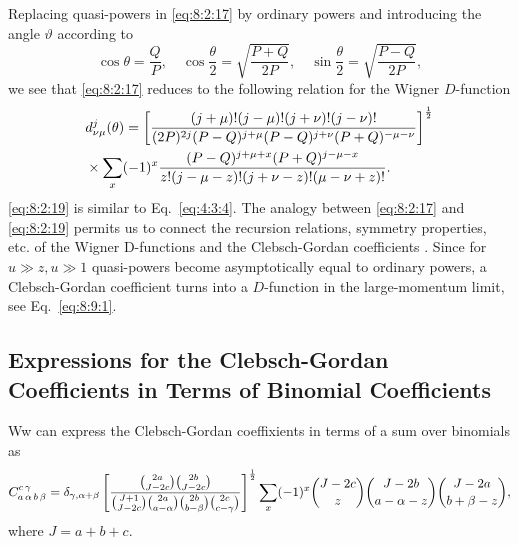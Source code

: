 Replacing quasi-powers in \eqref{eq:8:2:17} by ordinary powers and introducing the angle $\vartheta$ according to
\begin{equation}
\cos \theta=\frac{Q}{P}, \quad \cos \frac{\theta}{2}=\sqrt{\frac{P+Q}{2 P}}, \quad \sin \frac{\theta}{2}=\sqrt{\frac{P-Q}{2 P}}, \label{eq:8:2:18}
\end{equation}
we see that \eqref{eq:8:2:17} reduces to the following relation for the Wigner $D$-function
\begin{align}
& d_{\nu \mu}^{j}(\theta)=\left[\frac{(j+\mu)!(j-\mu)!(j+\nu)!(j-\nu)!}{(2 P)^{2 j}(P-Q)^{j+\mu}(P-Q)^{j+\nu}(P+Q)^{-\mu-\nu}}\right]^{\frac{1}{2}}  \notag\\
& \times \sum_{x}(-1)^{x} \frac{(P-Q)^{j+\mu+x}(P+Q)^{j-\mu-x}}{z!(j-\mu-z)!(j+\nu-z)!(\mu-\nu+z)!}. \label{eq:8:2:19}
\end{align}
\eqref{eq:8:2:19} is similar to Eq.~\eqref{eq:4:3:4}. The analogy between \eqref{eq:8:2:17} and \eqref{eq:8:2:19} permits us to connect the recursion relations, symmetry properties, etc. of the Wigner D-functions and the Clebsch-Gordan coefficients \cite{ref058}. Since for $u \gg z, u \gg 1$ quasi-powers become asymptotically equal to ordinary powers, a Clebsch-Gordan coefficient turns into a $D$-function in the large-momentum limit, see Eq.~\eqref{eq:8:9:1}.

\subsection{Expressions for the Clebsch-Gordan Coefficients in Terms of  Binomial Coefficients \cite{ref126}}\label{sec:8.2.4}
Ww can express the Clebsch-Gordan coeffixients in terms of a sum over binomials as
\begin{equation}
C_{a\,\alpha\,b\,\beta}^{c\,\gamma}=\delta_{\gamma, \alpha+\beta}\left[\frac{\binom{2 a}{J-2 c}\binom{2 b}{J-2 c}}{\binom{J+1}{J-2 c}\binom{2 a}{a-\alpha}\binom{2 b}{b-\beta}\binom{2 c}{c-\gamma}}\right]^{\frac{1}{2}} \sum_{x}(-1)^{x}\binom{J-2 c}{z}\binom{J-2 b}{a-\alpha-z}\binom{J-2 a}{b+\beta-z}, \label{eq:8:2:20}
\end{equation}
where $J=a+b+c$.

